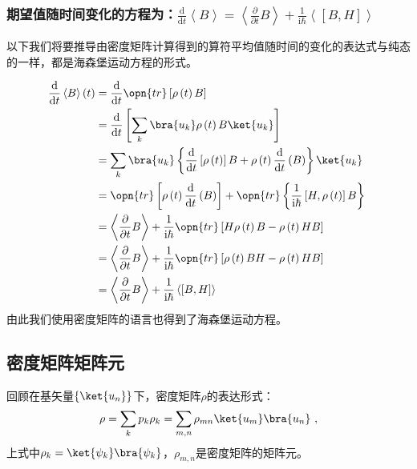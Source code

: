\subsubsection{期望值随时间变化的方程为：$\frac{\mathrm{d}}{\mathrm{d}t}\left\langle B \right\rangle = \left\langle \frac{\partial}{\partial t} B \right\rangle + \frac{1}{\mathrm{i}\hbar}\left\langle \left[ B, H \right]\right\rangle$}
    以下我们将要推导由密度矩阵计算得到的算符平均值随时间的变化的表达式与纯态的一样，都是海森堡运动方程的形式。
    
    \begin{equation}\label{eq_denMat_11}
    \begin{aligned}
    \frac{\mathrm{d}}{\mathrm{d}t}\left\langle B \right\rangle \left( t \right) &= \frac{\mathrm{d}}{\mathrm{d}t}\opn{tr}\left[\rho\left(t\right)B\right] \\
    &=\frac{\mathrm{d}}{\mathrm{d}t}\left[ \sum\limits_k \bra{u_k}\rho\left(t\right)B\ket{u_k}     \right] \\
    &= \sum\limits_k\bra{u_k}\left\{ \frac{\mathrm{d}}{\mathrm{d} t}\left[\rho \left(t\right)\right]B + \rho\left(t\right)\frac{\mathrm{d}}{\mathrm{d}t}\left( B\right) \right\}\ket{u_k} \\
    &=\opn{tr}\left[ \rho\left(t\right)\frac{\mathrm{d}}{\mathrm{d}t}\left(B\right) \right] + \opn{tr}\left\{\frac{1}{\mathrm{i}\hbar}\left[H,\rho\left(t\right)\right]B\right\} \\
    &=\left\langle \frac{\partial}{\partial t} B \right\rangle + \frac{1}{\mathrm{i}\hbar}\opn{tr}\left[H\rho\left(t\right)B - \rho\left(t\right)HB\right] \\
    &=\left\langle \frac{\partial}{\partial t}B\right\rangle + \frac{1}{\mathrm{i}\hbar}\opn{tr}\left[\rho\left(t\right)BH - \rho \left(t\right)HB\right] \\
    &=\left\langle\frac{\partial}{\partial t}B\right\rangle + \frac{1}{\mathrm{i}\hbar}\left\langle\left[B,H\right]\right\rangle
    \end{aligned}~
    \end{equation}
    由此我们使用密度矩阵的语言也得到了海森堡运动方程。



\subsection{密度矩阵矩阵元}


回顾在基矢量$\left\{ \ket{u_n}\right\}$下，密度矩阵$\rho$的表达形式：
$$\rho = \sum\limits_k p_k\rho_k = \sum\limits_{m,n}\rho_{mn}\ket{u_m}\bra{u_n} ~,$$
上式中$\rho_k = \ket{\psi_k}\bra{\psi_k}$，$\rho_{m,n}$是密度矩阵的矩阵元。

